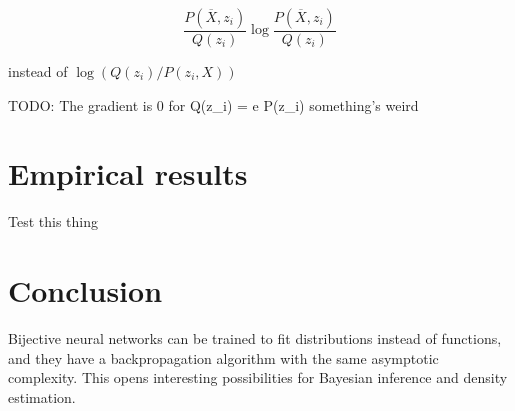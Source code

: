\documentclass{article}
\begin{document}
\[
  \frac{P(\overline{X}, z_i)}{Q(z_i)} \log \frac{P(\overline{X}, z_i)}{Q(z_i)}
\]

instead of \(\log(Q(z_i)/P(z_i, X))\)

TODO: The gradient is 0 for Q(z_i) = e P(z_i) something's weird


\section{Empirical results}

Test this thing


\section{Conclusion}

Bijective neural networks can be trained to fit distributions instead of
functions, and they have a backpropagation algorithm with the same asymptotic
complexity. This opens interesting possibilities for Bayesian inference and
density estimation.
\end{document}
